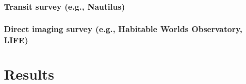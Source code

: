 \documentclass[modern,linenumbers]{aastex631}
\begin{document}
\subsubsection{Transit survey (e.g., Nautilus)}

\subsubsection{Direct imaging survey (e.g., Habitable Worlds Observatory, LIFE)}







\section{Results}
\label{sec:results}

\end{document}
